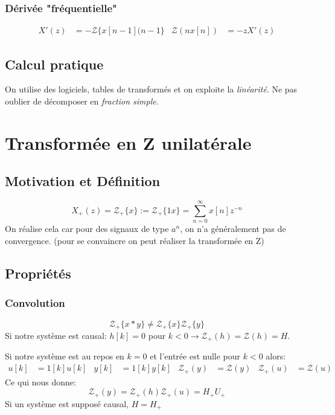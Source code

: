 \documentclass{report}
\begin{document}
\subsubsection{Dérivée "fréquentielle"}
\begin{align*}
X'(z) &= - \mathcal{Z}\{x[n-1](n-1\} & \mathcal{Z}(nx[n]) &= -z X'(z)
\end{align*}

\subsection{Calcul pratique}
On utilise des logiciels, tables de transformés et on exploite la \textit{linéarité}. Ne pas oublier de décomposer en \textit{fraction simple}.


\section{Transformée en Z unilatérale}
\subsection{Motivation et Définition}
\begin{equation}
X_+ (z) = \mathcal{Z}_+ \{x\} := \mathcal{Z}_+ \{1x\} = \sum_{n=0}^{\infty} x[n] z^{-n}
\end{equation}
On réalise cela car pour des signaux de type $a^n$, on n'a généralement pas de convergence. (pour se convaincre on peut réaliser la transformée en Z)

\subsection{Propriétés}
\subsubsection{Convolution}
\begin{equation}
\mathcal{Z}_+ \{x \ast y\} \neq \mathcal{Z}_+ \{x\} \mathcal{Z}_+ \{y\}
\end{equation}
Si notre système est causal: $h[k] = 0$ pour $k < 0 \rightarrow \mathcal{Z}_+ (h) = \mathcal{Z}(h) = H$.\par
Si notre système est au repos en $k=0$ et l'entrée est nulle pour $k<0$ alors:
\begin{align*}
u[k] &= 1[k] u[k] & y[k] &= 1[k]y[k] & \mathcal{Z}_+ (y) &= \mathcal{Z}(y) & \mathcal{Z}_+ (u) &= \mathcal{Z}(u)
\end{align*}
Ce qui nous donne:
\begin{equation}
\mathcal{Z}_+ (y) = \mathcal{Z}_+ (h) \mathcal{Z}_+ (u) = H_+ U_+
\end{equation}
Si un système est supposé causal, $H = H_+$
\end{document}
